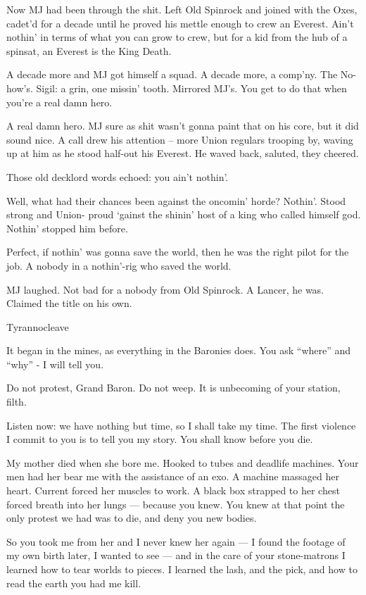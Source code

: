 Now MJ had been through the shit. Left Old Spinrock and joined with the Oxes, cadet’d for a
decade until he proved his mettle enough to crew an Everest. Ain’t nothin’ in terms of what you
can grow to crew, but for a kid from the hub of a spinsat, an Everest is the King Death.

A decade more and MJ got himself a squad. A decade more, a comp’ny. The No-how’s. Sigil: a
grin, one missin’ tooth. Mirrored MJ’s. You get to do that when you’re a real damn hero.




A real damn hero. MJ sure as shit wasn’t gonna paint that on his core, but it did sound nice. A call
drew his attention -- more Union regulars trooping by, waving up at him as he stood half-out his
Everest. He waved back, saluted, they cheered.

Those old decklord words echoed: you ain’t nothin’.

Well, what had their chances been against the oncomin’ horde? Nothin’. Stood strong and Union-
proud ‘gainst the shinin’ host of a king who called himself god. Nothin’ stopped him before.

Perfect, if nothin’ was gonna save the world, then he was the right pilot for the job. A nobody in a
nothin’-rig who saved the world.

MJ laughed. Not bad for a nobody from Old Spinrock. A Lancer, he was. Claimed the title on his
own.

Tyrannocleave

It began in the mines, as everything in the Baronies does. You ask “where” and “why” - I will tell
you.

Do not protest, Grand Baron. Do not weep. It is unbecoming of your station, filth.

Listen now: we have nothing but time, so I shall take my time. The first violence I commit to you is
to tell you my story. You shall know before you die.

My mother died when she bore me. Hooked to tubes and deadlife machines. Your men had her
bear me with the assistance of an exo. A machine massaged her heart. Current forced her
muscles to work. A black box strapped to her chest forced breath into her lungs — because you
knew. You knew at that point the only protest we had was to die, and deny you new bodies.

So you took me from her and I never knew her again — I found the footage of my own birth later, I
wanted to see — and in the care of your stone-matrons I learned how to tear worlds to pieces. I
learned the lash, and the pick, and how to read the earth you had me kill.

